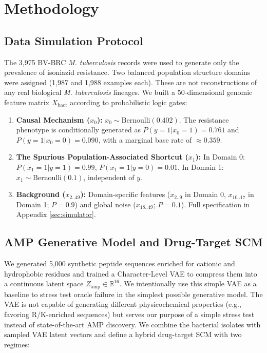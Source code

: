 \documentclass{article}
\begin{document}
\section{Methodology}
\subsection{Data Simulation Protocol}
The 3,975 BV-BRC \textit{M. tuberculosis} records were used to generate only the prevalence of isoniazid resistance. Two balanced population structure domains were assigned (1,987 and 1,988 examples each). These are not reconstructions of any real biological \textit{M. tuberculosis} lineages. We built a 50-dimensional genomic feature matrix $X_{\text{bact}}$ according to probabilistic logic gates:
\begin{enumerate}
    \item \textbf{Causal Mechanism ($x_0$):} $x_0 \sim \text{Bernoulli}(0.402)$. The resistance phenotype is conditionally generated as $P(y=1 | x_0=1) = 0.761$ and $P(y=1 | x_0=0) = 0.090$, with a marginal base rate of $\approx 0.359$.
    \item \textbf{The Spurious Population-Associated Shortcut ($x_1$):} In Domain 0: $P(x_1{=}1|y{=}1)=0.99$, $P(x_1{=}1|y{=}0)=0.01$. In Domain 1: $x_1 \sim \text{Bernoulli}(0.1)$, independent of $y$.
    \item \textbf{Background ($x_{2..49}$):} Domain-specific features ($x_{2..9}$ in Domain 0, $x_{10..17}$ in Domain 1; $P=0.9$) and global noise ($x_{18..49}$; $P=0.1$). Full specification in Appendix \ref{sec:simulator}.
\end{enumerate}

\subsection{AMP Generative Model and Drug-Target SCM}
We generated 5,000 synthetic peptide sequences enriched for cationic and hydrophobic residues and trained a Character-Level VAE to compress them into a continuous latent space $Z_{\text{amp}} \in \mathbb{R}^{16}$. We intentionally use this simple VAE as a baseline to stress test oracle failure in the simplest possible generative model. The VAE is not capable of generating different physicochemical properties (e.g., favoring R/K-enriched sequences) but serves our purpose of a simple stress test instead of state-of-the-art AMP discovery. We combine the bacterial isolates with sampled VAE latent vectors and define a hybrid drug-target SCM with two regimes:
\end{document}
